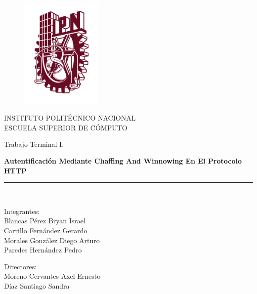 \documentclass[12pt, a4paper, titlepage]{report}
\begin{document}
	
	\begin{titlepage}
		
		\vspace*{-1.5in}
		\begin{figure}[htb]
			\begin{center}
				\includegraphics[width=4cm]{./imagenes/logoipn.png}
			\end{center}
		\end{figure}
		
		\begin{center}
		INSTITUTO POLITÉCNICO NACIONAL\\
		\vspace*{0.2in}
		ESCUELA SUPERIOR DE CÓMPUTO\\
		\vspace*{0.6in}
		\begin{large}
			Trabajo Terminal I.\\
		\end{large}
		\vspace*{0.2in}
		\begin{Large}
			\textbf{Autentificación Mediante Chaffing And Winnowing En El Protocolo HTTP} \\
		\end{Large}
		\vspace*{0.3in}
		\rule{80mm}{0.1mm}\\
		\vspace*{0.1in}
		\begin{large}
			\begin{center}
				Integrantes:\\
				Blancas Pérez Bryan Israel\\
				Carrillo Fernández Gerardo\\
				Morales González Diego Arturo\\
				Paredes Hernández Pedro\\
			\end{center}
		\end{large}
		\begin{large}
			Directores:\\
			Moreno Cervantes Axel Ernesto\\
			Díaz Santiago Sandra\\
		\end{large}
		\end{center}

	\end{titlepage}
	
\end{document}
